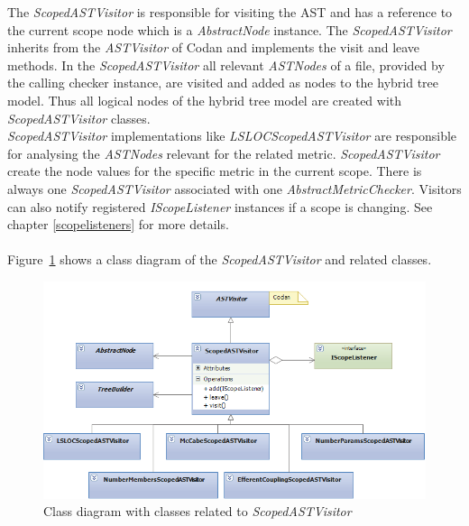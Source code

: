 \documentclass[11pt,a4paper,oneside]{scrreprt}
\begin{document}
The \textit{ScopedASTVisitor} is responsible for visiting the AST and has a reference to the current scope node which is a \textit{AbstractNode} instance. The \textit{ScopedASTVisitor} inherits from the \textit{ASTVisitor} of Codan and implements the visit and leave methods. In the \textit{ScopedASTVisitor} all relevant \textit{ASTNodes} of a file, provided by the calling checker instance, are visited and added as nodes to the hybrid tree model. Thus all logical nodes of the hybrid tree model are created with \textit{ScopedASTVisitor} classes.\\

\textit{ScopedASTVisitor} implementations like \textit{LSLOCScopedASTVisitor} are responsible for analysing the \textit{ASTNodes} relevant for the related metric. \textit{ScopedASTVisitor} create the node values for the specific metric in the current scope. There is always one \textit{ScopedASTVisitor} associated with one \textit{AbstractMetricChecker}. Visitors can also notify registered \textit{IScopeListener} instances if a scope is changing. See chapter \ref{scopelisteners} for more details.
\\\\
Figure~\ref{fig:scoped_ast_visitor} shows a class diagram of the \textit{ScopedASTVisitor} and related classes.

\begin{figure}[th]
\begin{center}
\includegraphics[width=\textwidth]{figures/scoped_ast_visitor.png}
\end{center}
\caption{Class diagram with classes related to \textit{ScopedASTVisitor}}
\label{fig:scoped_ast_visitor}
\end{figure}
\end{document}
